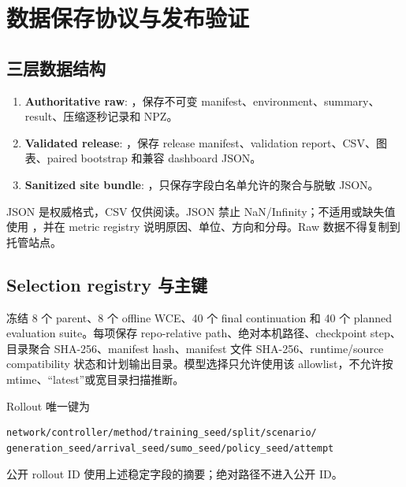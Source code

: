 \chapter{数据保存协议与发布验证}

\section{三层数据结构}
\begin{enumerate}
  \item \textbf{Authoritative raw}: ，保存不可变 manifest、environment、summary、result、压缩逐秒记录和 NPZ。
  \item \textbf{Validated release}: ，保存 release manifest、validation report、CSV、图表、paired bootstrap 和兼容 dashboard JSON。
  \item \textbf{Sanitized site bundle}: ，只保存字段白名单允许的聚合与脱敏 JSON。
\end{enumerate}

JSON 是权威格式，CSV 仅供阅读。JSON 禁止 NaN/Infinity；不适用或缺失值使用 ，并在 metric registry 说明原因、单位、方向和分母。Raw 数据不得复制到托管站点。

\section{Selection registry 与主键}
 冻结 8 个 parent、8 个 offline WCE、40 个 final continuation 和 40 个 planned evaluation suite。每项保存 repo-relative path、绝对本机路径、checkpoint step、目录聚合 SHA-256、manifest hash、manifest 文件 SHA-256、runtime/source compatibility 状态和计划输出目录。模型选择只允许使用该 allowlist，不允许按 mtime、“latest”或宽目录扫描推断。

Rollout 唯一键为
\begin{Verbatim}[fontsize=\small,breaklines=true]
network/controller/method/training_seed/split/scenario/
generation_seed/arrival_seed/sumo_seed/policy_seed/attempt
\end{Verbatim}
公开 rollout ID 使用上述稳定字段的摘要；绝对路径不进入公开 ID。

